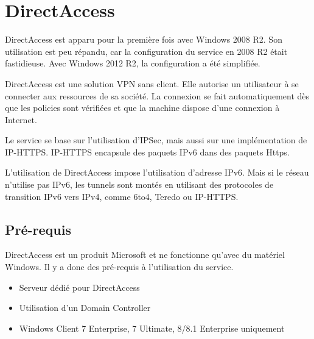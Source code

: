 \section{DirectAccess}
DirectAccess est apparu pour la première fois avec Windows 2008 R2.
Son utilisation est peu répandu, car la configuration du service en 2008 R2 était fastidieuse. 
Avec Windows 2012 R2, la configuration a été simplifiée.

DirectAccess est une solution VPN sans client. 
Elle autorise un utilisateur à se connecter aux ressources de sa société.
La connexion se fait automatiquement dès que les policies sont vérifiées et que la machine dispose d'une connexion à Internet.

Le service se base sur l'utilisation d'IPSec, mais aussi sur une implémentation de IP-HTTPS.
IP-HTTPS encapsule des paquets IPv6 dans des paquets Https. 

L'utilisation de DirectAccess impose l'utilisation d'adresse IPv6.
Mais si le réseau n'utilise pas IPv6, les tunnels sont montés en utilisant des protocoles de transition IPv6 vers IPv4, comme 6to4, Teredo ou IP-HTTPS.

\subsection{Pré-requis}
DirectAccess est un produit Microsoft et ne fonctionne qu'avec du matériel Windows.
Il y a donc des pré-requis à l'utilisation du service.
\begin{itemize}
	\item Serveur dédié pour DirectAccess
	\item Utilisation d'un Domain Controller
	\item Windows Client 7 Enterprise, 7 Ultimate, 8/8.1 Enterprise uniquement
\end{itemize}
